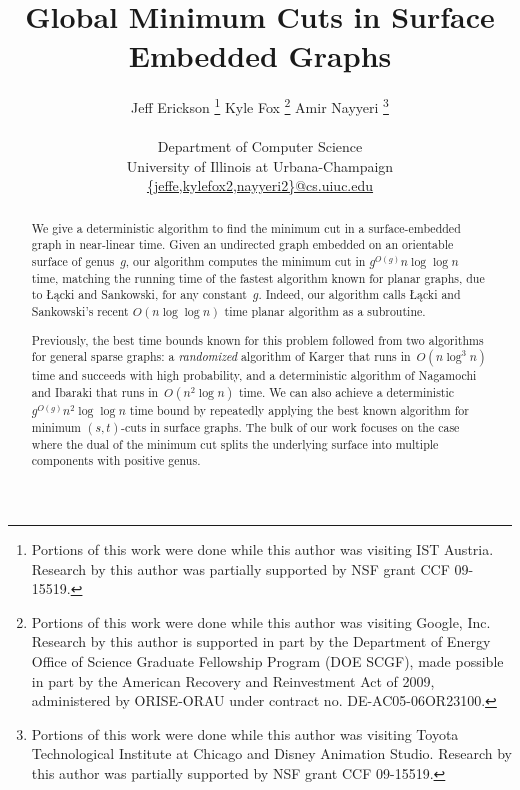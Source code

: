 \documentclass[twoside,leqno,twocolumn]{article}
\begin{document}
\title{Global Minimum Cuts in Surface Embedded Graphs}

\author{
	Jeff Erickson%
		\thanks{Portions of this work were done while this author was
				visiting IST Austria.  Research by this author was
				partially supported by NSF grant CCF 09-15519.}
	\hspace{0.5in}
	Kyle Fox%
		\thanks{Portions of this work were done while this author was
				visiting Google, Inc.  Research by this author is
				supported in part by the Department of Energy Office
				of Science Graduate Fellowship Program (DOE SCGF),
				made possible in part by the American Recovery and
				Reinvestment Act of 2009, administered by ORISE-ORAU
				under contract no. DE-AC05-06OR23100.}
	\hspace{0.5in}
	Amir Nayyeri
		\thanks{Portions of this work were done while this author was
				visiting Toyota Technological Institute at Chicago and
				Disney Animation Studio.  Research by this author was partially
				supported by NSF grant CCF 09-15519.}
	\\[1ex]
	\normalsize
	\begin{tabular}{c}
	Department of Computer Science\\
	University of Illinois at Urbana-Champaign\\
	\protect\url{{jeffe,kylefox2,nayyeri2}@cs.uiuc.edu}
	\end{tabular}
}


\maketitle

\begin{abstract}
We give a deterministic algorithm to find the minimum cut in a surface-embedded graph in near-linear time. Given an undirected graph embedded on an orientable surface of genus~$g$, our algorithm computes the minimum cut in $g^{O(g)}n \log \log n$ time, matching the running time of the fastest algorithm known for planar graphs, due to Łącki and Sankowski, for any constant~$g$.  Indeed, our algorithm calls Łącki and Sankowski's recent $O(n \log \log n)$ time planar algorithm as a subroutine.

Previously, the best time bounds known for this problem followed from two algorithms for general sparse graphs: a \emph{randomized} algorithm of Karger that runs in~$O(n \log^3 n)$ time and succeeds with high probability, and a deterministic algorithm of Nagamochi and Ibaraki that runs in~$O(n^2 \log n)$ time.  We can also achieve a deterministic $g^{O(g)} n^2 \log \log n$ time bound by repeatedly applying the best known algorithm for minimum $(s,t)$-cuts in surface graphs.  The bulk of our work focuses on the case where the dual of the minimum cut splits the underlying surface into multiple components with positive genus.
\end{abstract}
\end{document}
